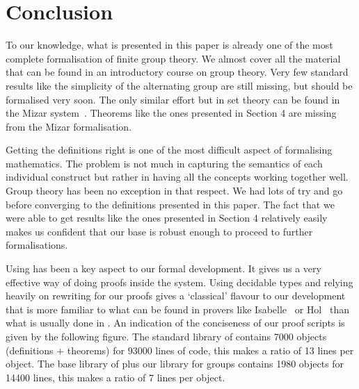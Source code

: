 \section{Conclusion}


To our knowledge, what is presented in this paper is already one of the most
complete formalisation of finite group theory. 
We almost cover all the material that can be found in an introductory course on 
group theory. Very few standard results like the simplicity
of the alternating group are still missing, but should be formalised very soon.
The only similar effort but in set theory
can be found in the Mizar system~\cite{Mizar}. Theorems like the ones
presented in Section 4 are missing from the Mizar formalisation.

Getting the definitions right is one of the most difficult aspect of
formalising mathematics. The problem is not much in capturing the 
semantics of each individual construct but rather in having all the concepts 
working together well. Group theory has been no exception in that respect.
We had lots of try and go before converging to the definitions 
presented in this paper. The fact that we were able to get 
results like the ones presented in Section 4 relatively
easily makes us confident 
that our base is robust enough to proceed to further formalisations.

Using \ssr{} has been a key aspect to our formal development. It gives
us a very effective way of doing proofs inside the \Coq{} system.
Using decidable types and relying heavily on rewriting for our proofs
gives a `classical' flavour to our development that is more familiar
to what can be found in provers like {\sc Isabelle}~\cite{Isabelle} or {\sc Hol}~\cite{Hol} than 
what is usually done in \Coq.
An indication of the conciseness of our proof scripts
is given by the following figure. The standard library of \Coq{} contains
7000 objects (definitions + theorems) for  93000 lines of code, this makes a ratio of 
13 lines per object. The base library of \ssr{} plus our library for groups contains
1980 objects for 14400 lines, this makes a ratio of 7 lines per object.

